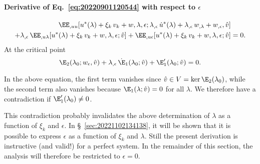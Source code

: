 \paragraph{Derivative of Eq.~\eqref{eq:20220901120544} with respect to \(\epsilon\)}
\begin{equation}
  \begin{aligned}[b]
    \EE_{,uu}[u^\ast(\lambda) + \xi_k \, v_k + w, \lambda, \epsilon; \lambda_{,\epsilon} \, \dot{u}^\ast(\lambda) + \lambda_{,\epsilon} \, w_{,\lambda} + w_{,\epsilon}, \hat{v}] &\\
    + \lambda_{,\epsilon} \, \EE_{,u\lambda}[u^\ast(\lambda) + \xi_k \, v_k + w, \lambda, \epsilon; \hat{v}] + \EE_{,u\epsilon}[u^\ast(\lambda) + \xi_k \, v_k + w, \lambda, \epsilon; \hat{v}] &= 0.
  \end{aligned}
\end{equation}
At the critical point
\begin{equation}
  \E_2(\lambda_0; w_\epsilon, \hat{v}) + \lambda_{,\epsilon} \, \dot{\E}_1(\lambda_0; \hat{v}) + \E_1'(\lambda_0; \hat{v}) = 0.
\end{equation}

In the above equation, the first term vanishes since \(\hat{v} \in V = \ker \E_2(\lambda_0)\), while the second term also
vanishes because \(\E_1(\lambda; \hat{v}) = 0\) for all \(\lambda\). We therefore have a contradiction if \(\E_1'(\lambda_0) \neq 0\).

\begin{remark}
  This contradiction probably invalidates the above determination of \(\lambda\) as a function of \(\xi_k\) and
  \(\epsilon\). In \S~\ref{sec:20221102134138}, it will be shown that it is possible to express \(\epsilon\) as a function of
  \(\xi_k\) and \(\lambda\). Still the present derivation is instructive (and valid!) for a perfect system. In the remainder of
  this section, the analysis will therefore be restricted to \(\epsilon=0\).
\end{remark}

